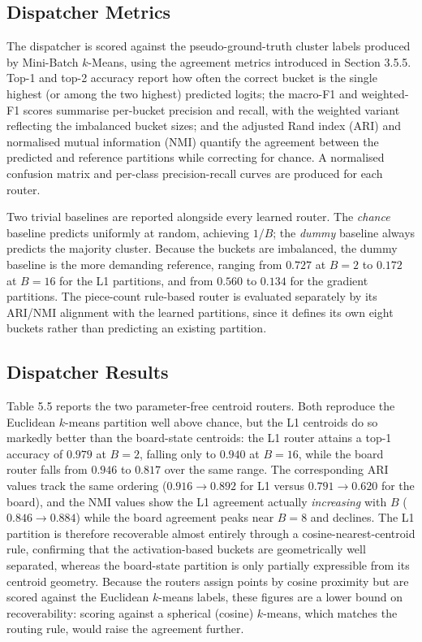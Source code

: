\subsection{Dispatcher Metrics}

The dispatcher is scored against the pseudo-ground-truth cluster labels produced by Mini-Batch $k$-Means, using the agreement metrics introduced in Section 3.5.5. Top-1 and top-2 accuracy report how often the correct bucket is the single highest (or among the two highest) predicted logits; the macro-F1 and weighted-F1 scores summarise per-bucket precision and recall, with the weighted variant reflecting the imbalanced bucket sizes; and the adjusted Rand index (ARI) and normalised mutual information (NMI) quantify the agreement between the predicted and reference partitions while correcting for chance. A normalised confusion matrix and per-class precision-recall curves are produced for each router.

Two trivial baselines are reported alongside every learned router. The \emph{chance} baseline predicts uniformly at random, achieving $1/B$; the \emph{dummy} baseline always predicts the majority cluster. Because the buckets are imbalanced, the dummy baseline is the more demanding reference, ranging from $0.727$ at $B=2$ to $0.172$ at $B=16$ for the L1 partitions, and from $0.560$ to $0.134$ for the gradient partitions. The piece-count rule-based router is evaluated separately by its ARI/NMI alignment with the learned partitions, since it defines its own eight buckets rather than predicting an existing partition.

\subsection{Dispatcher Results}

Table 5.5 reports the two parameter-free centroid routers. Both reproduce the Euclidean $k$-means partition well above chance, but the L1 centroids do so markedly better than the board-state centroids: the L1 router attains a top-1 accuracy of $0.979$ at $B=2$, falling only to $0.940$ at $B=16$, while the board router falls from $0.946$ to $0.817$ over the same range. The corresponding ARI values track the same ordering ($0.916 \to 0.892$ for L1 versus $0.791 \to 0.620$ for the board), and the NMI values show the L1 agreement actually \emph{increasing} with $B$ ($0.846 \to 0.884$) while the board agreement peaks near $B=8$ and declines. The L1 partition is therefore recoverable almost entirely through a cosine-nearest-centroid rule, confirming that the activation-based buckets are geometrically well separated, whereas the board-state partition is only partially expressible from its centroid geometry. Because the routers assign points by cosine proximity but are scored against the Euclidean $k$-means labels, these figures are a lower bound on recoverability: scoring against a spherical (cosine) $k$-means, which matches the routing rule, would raise the agreement further.

